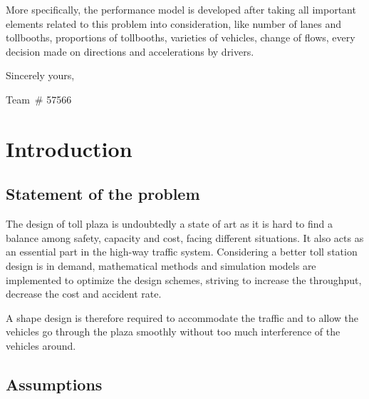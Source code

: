 \documentclass{mcmthesis}
\begin{document}
More specifically, the performance model is developed after taking all important elements related to this problem into consideration, like number of lanes and tollbooths, proportions of tollbooths, varieties of vehicles, change of flows, every decision made on directions and accelerations by drivers.\vspace{7ex}

Sincerely yours,


Team\ \# 57566

\clearpage

\section{Introduction}

\subsection{Statement of the problem}

The design of toll plaza is undoubtedly a state of art as it is hard to find a balance among safety, capacity and cost, facing different situations. It also acts as an essential part in the high-way traffic system. Considering a better toll station design is in demand, mathematical methods and simulation models are implemented to optimize the design schemes, striving to increase the throughput, decrease the cost and accident rate.

A shape design is therefore required to accommodate the traffic and to allow the vehicles go through the plaza smoothly without too much interference of the vehicles around.

\subsection{Assumptions}
\end{document}

